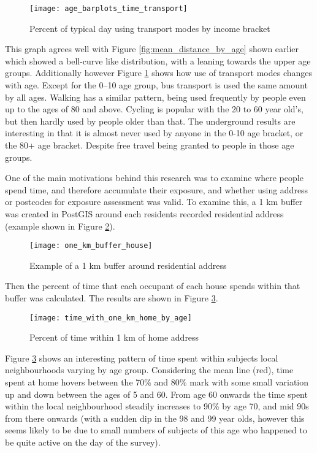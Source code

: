 \begin{figure}[H]
\centering
\texttt{[image: age\_barplots\_time\_transport]}
\caption{Percent of typical day using transport modes by income bracket}
\label{fig:age_barplots_time_transport}
\end{figure}

This graph agrees well with Figure \ref{fig:mean_distance_by_age} shown earlier which showed a bell-curve like distribution, with a leaning towards the upper age groups. Additionally however Figure \ref{fig:age_barplots_time_transport} shows how use of transport modes changes with age. Except for the 0--10 age group, bus transport is used the same amount by all ages. Walking has a similar pattern, being used frequently by people even up to the ages of 80 and above. Cycling is popular with the 20 to 60 year old's, but then hardly used by people older than that. The underground results are interesting in that it is almost never used by anyone in the 0-10 age bracket, or the 80+ age bracket. Despite free travel being granted to people in those age groups.

One of the main motivations behind this research was to examine where people spend time, and therefore accumulate their exposure, and whether using address or postcodes for exposure assessment was valid. To examine this, a 1 km buffer was created in PostGIS around each residents recorded residential address (example shown in Figure \ref{fig:one_km_buffer_house}).

\begin{figure}[H]
\centering
\texttt{[image: one\_km\_buffer\_house]}
\caption{Example of a 1 km buffer around residential address}
\label{fig:one_km_buffer_house}
\end{figure}

Then the percent of time that each occupant of each house spends within that buffer was calculated. The results are shown in Figure \ref{fig:time_with_one_km_home_by_age}.

\begin{landscape}

\begin{figure}[H]
\centering
\texttt{[image: time\_with\_one\_km\_home\_by\_age]}
\caption{Percent of time within 1 km of home address}
\label{fig:time_with_one_km_home_by_age}
\end{figure}

\end{landscape}

Figure \ref{fig:time_with_one_km_home_by_age} shows an interesting pattern of time spent within subjects local neighbourhoods varying by age group. Considering the mean line (red), time spent at home hovers between the 70\% and 80\% mark with some small variation up and down between the ages of 5 and 60. From age 60 onwards the time spent within the local neighbourhood steadily increases to 90\% by age 70, and mid 90s from there onwards (with a sudden dip in the 98 and 99 year olds, however this seems likely to be due to small numbers of subjects of this age who happened to be quite active on the day of the survey).

